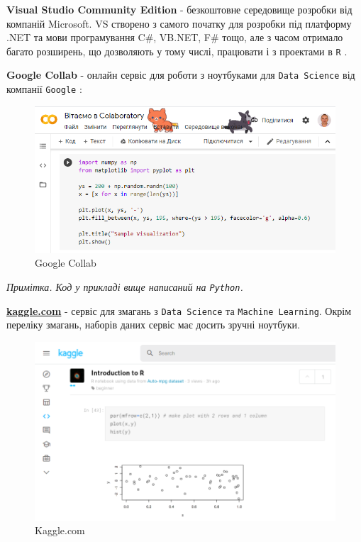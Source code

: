 \documentclass[
]{book}
\begin{document}
\textbf{Visual Studio Community Edition} - безкоштовне середовище розробки від компаній Microsoft. VS створено з самого початку для розробки під платформу .NET та мови програмування C\#, VB.NET, F\# тощо, але з часом отримало багато розширень, що дозволяють у тому числі, працювати і з проектами в \texttt{R} \citep{visual-studio}.

\textbf{Google Collab} - онлайн сервіс для роботи з ноутбуками для \texttt{Data\ Science} від компанії \texttt{Google} \citep{google-collab}:

\begin{figure}
\includegraphics[width=9.99in]{images/chapter1/google_collab} \caption{Google Collab}\label{fig:unnamed-chunk-29}
\end{figure}

\emph{Примітка. Код у прикладі вище написаний на \texttt{Python}.}

\href{https://kaggle.com}{\textbf{kaggle.com}} - сервіс для змагань з \texttt{Data\ Science} та \texttt{Machine\ Learning}. Окрім переліку змагань, наборів даних сервіс має досить зручні ноутбуки.

\begin{figure}
\includegraphics[width=11.92in]{images/chapter1/kaggle} \caption{Kaggle.com}\label{fig:unnamed-chunk-30}
\end{figure}
\end{document}
